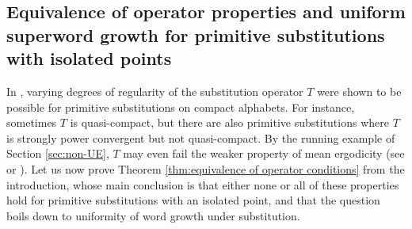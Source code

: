 \documentclass[11pt]{amsart}
\numberwithin{equation}{section}
\theoremstyle{plain}
\theoremstyle{definition}
\begin{document}
\subsection{Equivalence of operator properties and uniform superword growth for primitive substitutions with isolated points}\label{sec:equivalence of operator properties}

In \cite{MRW25}, varying degrees of regularity of the substitution operator \(T\) were shown to be possible for primitive substitutions on compact alphabets. For instance, sometimes \(T\) is quasi-compact, but there are also primitive substitutions where \(T\) is strongly power convergent but not quasi-compact. By the running example of Section \ref{sec:non-UE}, \(T\) may even fail the weaker property of mean ergodicity (see \cite[Definition 8.4]{EFHN15} or \cite[Section 5]{MRW25}). Let us now prove Theorem \ref{thm:equivalence of operator conditions} from the introduction, whose main conclusion is that either none or all of these properties hold for primitive substitutions with an isolated point, and that the question boils down to uniformity of word growth under substitution.
\end{document}
